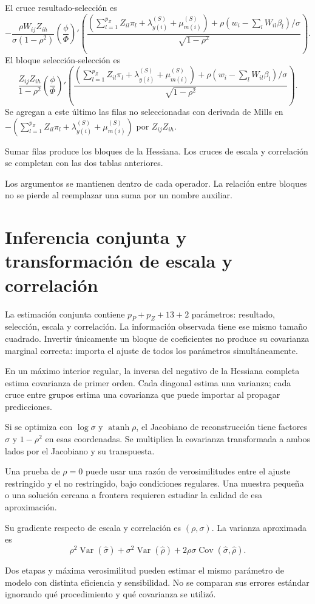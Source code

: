 \documentclass[11pt,a4paper]{article}
\DeclareMathOperator{\Var}{Var}
\DeclareMathOperator{\Cov}{Cov}
\begin{document}
El cruce resultado-selección es
\[
-\frac{\rho W_{ij}Z_{ih}}{\sigma(1-\rho^2)}
\left(\frac{\phi}{\Phi}\right)'
\left(
\frac{\left(\sum_{l=1}^{p_Z}Z_{il}\pi_l+\lambda_{y(i)}^{(S)}+\mu_{m(i)}^{(S)}\right)+
\rho(w_i-\sum_lW_{il}\beta_l)/\sigma}
{\sqrt{1-\rho^2}}\right).
\]
El bloque selección-selección es
\[
\frac{Z_{ij}Z_{ih}}{1-\rho^2}
\left(\frac{\phi}{\Phi}\right)'
\left(
\frac{\left(\sum_{l=1}^{p_Z}Z_{il}\pi_l+\lambda_{y(i)}^{(S)}+\mu_{m(i)}^{(S)}\right)+
\rho(w_i-\sum_lW_{il}\beta_l)/\sigma}
{\sqrt{1-\rho^2}}\right).
\]
Se agregan a este último
las filas no seleccionadas
con derivada de Mills
en \(-\left(\sum_{l=1}^{p_Z}Z_{il}\pi_l+\lambda_{y(i)}^{(S)}+\mu_{m(i)}^{(S)}\right)\)
por \(Z_{ij}Z_{ih}\).

Sumar filas produce los
bloques de la Hessiana.
Los cruces de escala
y correlación se completan
con las dos tablas anteriores.

Los argumentos se mantienen
dentro de cada operador.
La relación entre bloques
no se pierde al
reemplazar una suma
por un nombre auxiliar.


\clearpage
\section{Inferencia conjunta y transformación de escala y correlación}

La estimación conjunta contiene
\(p_P+p_Z+13+2\) parámetros:
resultado, selección, escala y correlación.
La información observada tiene
ese mismo tamaño cuadrado.
Invertir únicamente un bloque
de coeficientes no produce
su covarianza marginal correcta:
importa el ajuste de
todos los parámetros simultáneamente.

En un máximo interior regular,
la inversa del negativo
de la Hessiana completa
estima covarianza de primer orden.
Cada diagonal estima una varianza;
cada cruce entre grupos
estima una covarianza
que puede importar al
propagar predicciones.

Si se optimiza con
\(\log\sigma\) y
\(\operatorname{atanh}\rho\),
el Jacobiano de reconstrucción
tiene factores \(\sigma\)
y \(1-\rho^2\)
en esas coordenadas.
Se multiplica la covarianza
transformada a ambos lados
por el Jacobiano y
su transpuesta.

Una prueba de \(\rho=0\)
puede usar una razón
de verosimilitudes entre
el ajuste restringido
y el no restringido,
bajo condiciones regulares.
Una muestra pequeña o
una solución cercana a frontera
requieren estudiar la calidad
de esa aproximación.

\begin{ejemplo}[Compuesto \(\kappa=\rho\sigma\)]
Su gradiente respecto de
escala y correlación es
\((\rho,\sigma)\).
La varianza aproximada es
\[
\rho^2\Var(\widehat\sigma)
+\sigma^2\Var(\widehat\rho)
+2\rho\sigma\Cov(\widehat\sigma,\widehat\rho).
\]
\end{ejemplo}
Dos etapas y máxima
verosimilitud pueden estimar
el mismo parámetro de
modelo con distinta
eficiencia y sensibilidad.
No se comparan sus
errores estándar ignorando
qué procedimiento y
qué covarianza se utilizó.
\end{document}
